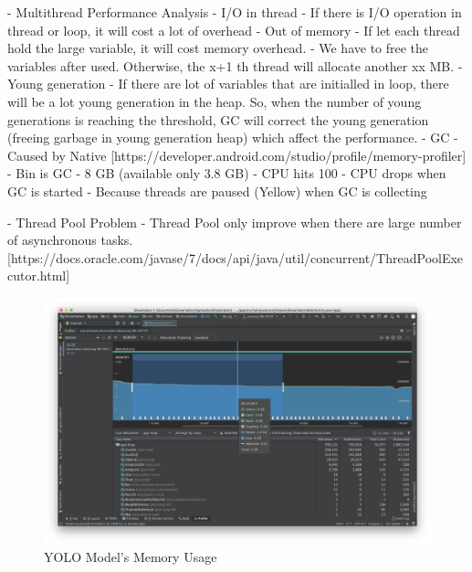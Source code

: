             -	Multithread Performance Analysis
                - I/O in thread
                    - If there is I/O operation in thread or loop, it will cost a lot of overhead
                - Out of memory
                    - If let each thread hold the large variable, it will cost memory overhead.
                    - We have to free the variables after used. Otherwise, the x+1 th thread will allocate another xx MB.
                - Young generation
                    - If there are lot of variables that are initialled in loop, there will be a lot young generation in the heap. So, when the number of young generations is reaching the threshold, GC will correct the young generation (freeing garbage in young generation heap) which affect the performance.
                - GC
                    - Caused by Native [https://developer.android.com/studio/profile/memory-profiler]
                    - Bin is GC
                    - 8 GB (available only 3.8 GB)
                - CPU hits 100%
                - CPU drops when GC is started
                        - Because threads are paused (Yellow) when GC is collecting

            - Thread Pool Problem
                - Thread Pool only improve when there are large number of asynchronous tasks. [https://docs.oracle.com/javase/7/docs/api/java/util/concurrent/ThreadPoolExecutor.html]

        \begin{figure}[!ht]
            \includegraphics[width=6in]{images/chapter5/gc-problem/gc-collecting.png}
            \caption{YOLO Model's Memory Usage}
            \label{yolo:memoryUsage}
        \end{figure}

